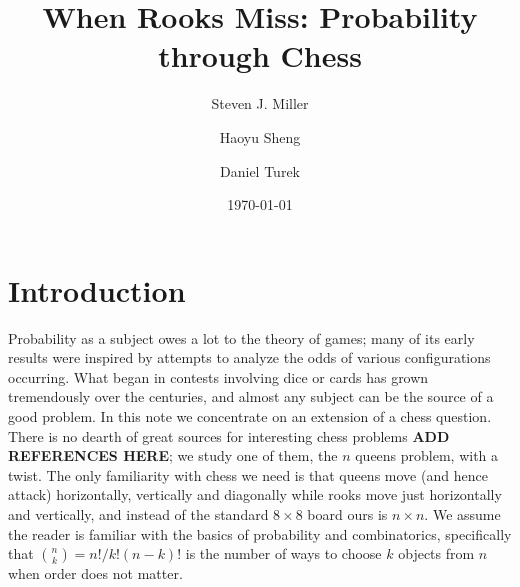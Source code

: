 \documentclass[12pt,reqno]{amsart}
\title{When Rooks Miss: Probability through Chess}
\author{Steven J. Miller}
\author{Haoyu Sheng}
\author{Daniel Turek}
\date{\today}
\numberwithin{equation}{section}
\theoremstyle{plain}
\newcommand{\ncr}[2]{{#1 \choose #2}}
\begin{document}
\begin{abstract}  \end{abstract}

\maketitle
\tableofcontents

\section{Introduction}

Probability as a subject owes a lot to the theory of games; many of its early results were inspired by attempts to analyze the odds of various configurations occurring. What began in contests involving dice or cards has grown tremendously over the centuries, and almost any subject can be the source of a good problem. In this note we concentrate on an extension of a chess question. There is no dearth of great sources for interesting chess problems \textbf{ADD REFERENCES HERE}; we study one of them, the $n$ queens problem, with a twist. The only familiarity with chess we need is that queens move (and hence attack) horizontally, vertically and diagonally while rooks move just horizontally and vertically, and instead of the standard $8 \times 8$ board ours is $n \times n$. We assume the reader is familiar with the basics of probability and combinatorics, specifically that $\ncr{n}{k} = n! / k!(n-k)!$ is the number of ways to choose $k$ objects from $n$ when order does not matter.
\end{document}

